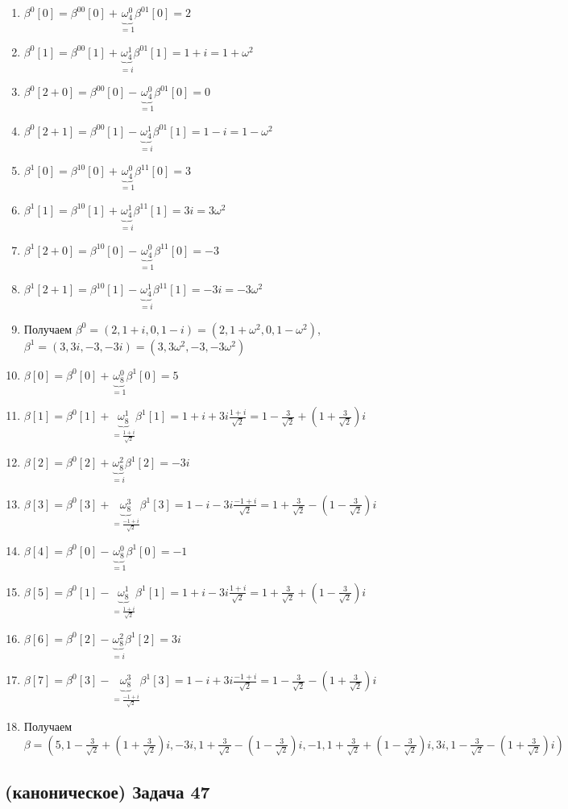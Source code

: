 \documentclass[a4paper]{article}
\begin{document}
\begin{enumerate}
\begin{enumerate}
\item $\beta^0[0]=\beta^{00}[0]+\underbrace{\omega_4^0}_{=1}\beta^{01}[0]=2$
\item $\beta^0[1]=\beta^{00}[1]+\underbrace{\omega_4^1}_{=i}\beta^{01}[1]=1+i=1+\omega^2$
\item $\beta^0[2+0]=\beta^{00}[0]-\underbrace{\omega_4^0}_{=1}\beta^{01}[0]=0$
\item $\beta^0[2+1]=\beta^{00}[1]-\underbrace{\omega_4^1}_{=i}\beta^{01}[1]=1-i=1-\omega^2$
\newpage
\item $\beta^1[0]=\beta^{10}[0]+\underbrace{\omega_4^0}_{=1}\beta^{11}[0]=3$
\item $\beta^1[1]=\beta^{10}[1]+\underbrace{\omega_4^1}_{=i}\beta^{11}[1]=3i=3\omega^2$
\item $\beta^1[2+0]=\beta^{10}[0]-\underbrace{\omega_4^0}_{=1}\beta^{11}[0]=-3$
\item $\beta^1[2+1]=\beta^{10}[1]-\underbrace{\omega_4^1}_{=i}\beta^{11}[1]=-3i=-3\omega^2$
\item Получаем $\beta^0=(2,1+i,0,1-i)=(2,1+\omega^2,0,1-\omega^2)$, $\beta^1=(3,3i,-3,-3i)=(3,3\omega^2,-3,-3\omega^2)$
\item $\beta[0]=\beta^0[0]+\underbrace{\omega_8^0}_{=1}\beta^1[0]=5$
\item $\beta[1]=\beta^0[1]+\underbrace{\omega_8^1}_{=\frac{1+i}{\sqrt{2}}}\beta^1[1]=1+i+3i\frac{1+i}{\sqrt{2}}=1-\frac{3}{\sqrt{2}}+(1+\frac{3}{\sqrt{2}})i$
\item $\beta[2]=\beta^0[2]+\underbrace{\omega_8^2}_{=i}\beta^1[2]=-3i$
\item $\beta[3]=\beta^0[3]+\underbrace{\omega_8^3}_{=\frac{-1+i}{\sqrt{2}}}\beta^1[3]=1-i-3i\frac{-1+i}{\sqrt{2}}=1+\frac{3}{\sqrt{2}}-(1-\frac{3}{\sqrt{2}})i$

\item $\beta[4]=\beta^0[0]-\underbrace{\omega_8^0}_{=1}\beta^1[0]=-1$
\item $\beta[5]=\beta^0[1]-\underbrace{\omega_8^1}_{=\frac{1+i}{\sqrt{2}}}\beta^1[1]=1+i-3i\frac{1+i}{\sqrt{2}}=1+\frac{3}{\sqrt{2}}+(1-\frac{3}{\sqrt{2}})i$
\item $\beta[6]=\beta^0[2]-\underbrace{\omega_8^2}_{=i}\beta^1[2]=3i$
\item $\beta[7]=\beta^0[3]-\underbrace{\omega_8^3}_{=\frac{-1+i}{\sqrt{2}}}\beta^1[3]=1-i+3i\frac{-1+i}{\sqrt{2}}=1-\frac{3}{\sqrt{2}}-(1+\frac{3}{\sqrt{2}})i$
\item Получаем $\beta=(5,1-\frac{3}{\sqrt{2}}+(1+\frac{3}{\sqrt{2}})i,-3i,1+\frac{3}{\sqrt{2}}-(1-\frac{3}{\sqrt{2}})i,-1,1+\frac{3}{\sqrt{2}}+(1-\frac{3}{\sqrt{2}})i,3i,1-\frac{3}{\sqrt{2}}-(1+\frac{3}{\sqrt{2}})i)$
\end{enumerate}

\end{enumerate}
\subsection*{(каноническое) Задача 47}
\end{document}
